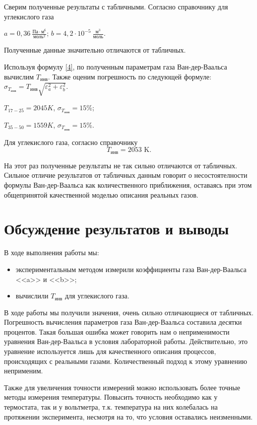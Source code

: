 \documentclass[a4paper,12pt]{article} %
\begin{document}
Сверим полученные результаты с табличными. Согласно справочнику для углекислого газа
\begin{center}
    
$\displaystyle a = 0,36 \  \frac{\text{Па}\cdot\text{м}^6}{\text{моль}^2}$; \break$\displaystyle b = 4,2\cdot 10^{-5} \ \frac{\text{м}^3}{\text{моль}}.$ 
\end{center}
Полученные данные значительно отличаются от табличных.

Используя формулу \eqref{4}, по полученным параметрам газа Ван-дер-Ваальса вычислим $ T_\text{инв} $. Также оценим погрешность по следующей формуле:
$\displaystyle \sigma_{T_\text{инв}} = T_\text{инв}\sqrt{\varepsilon^2_a+\varepsilon_b^2}.$

\begin{center}
    $\displaystyle T_{17-25} = 2045 K$, $\displaystyle \sigma_{T_{\text{инв}}} = 15\%$; \break
    
    $\displaystyle T_{35-50} = 1559 K$, $\displaystyle \sigma_{T_{\text{инв}}} = 15\%$.
\end{center}

Для углекислого газа, согласно справочнику  \[ T_\text{инв} = 2053 \text{ K}.\]

На этот раз полученные результаты не так сильно отличаются от табличных. Сильное отличие результатов от табличных данным говорит о несостоятелности формулы Ван-дер-Ваальса как количественного приближения, оставаясь при этом общепринятой качественной моделью описания реальных газов.

\section{Обсуждение результатов и выводы}

В ходе выполнения работы мы:

\begin{itemize}
	\item экспериментальным методом измерили коэффициенты газа Ван-дер-Ваальса <<a>> и <<b>>;
	\item вычислили $ T_\text{инв} $ для углекислого газа.
\end{itemize}

В ходе работы мы получили значения, очень сильно отличающиеся от табличных. Погрешность вычисления параметров газа Ван-дер-Ваальса составила десятки процентов. Такая большая ошибка может говорить нам о неприменимости уравнения Ван-дер-Ваальса в условия лабораторной работы. Действительно, это уравнение используется лишь для качественного описания процессов, происходящих с реальными газами. Количественный подход к этому уравнению неприменим.

Также для увеличения точности измерений можно использовать более точные методы измерения температуры. Повысить точность необходимо как у термостата, так и у вольтметра, т.к. температура на них колебалась на протяжении эксперимента, несмотря на то, что условия оставались неизменными.
\end{document}
